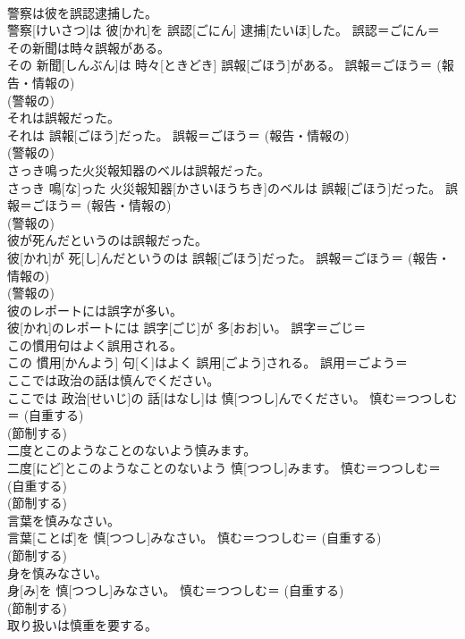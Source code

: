 \documentclass[8pt]{extreport}
\begin{document}
\begin{CJK}{UTF8}{min}
{\\	警察は彼を誤認逮捕した。	
\\	警察[けいさつ]は 彼[かれ]を 誤認[ごにん] 逮捕[たいほ]した。	誤認＝ごにん＝ 
\\	その新聞は時々誤報がある。	
\\	その 新聞[しんぶん]は 時々[ときどき] 誤報[ごほう]がある。	誤報＝ごほう＝ (報告・情報の) 
\\	(警報の) 
\\	それは誤報だった。	
\\	それは 誤報[ごほう]だった。	誤報＝ごほう＝ (報告・情報の) 
\\	(警報の) 
\\	さっき鳴った火災報知器のベルは誤報だった。	
\\	さっき 鳴[な]った 火災報知器[かさいほうちき]のベルは 誤報[ごほう]だった。	誤報＝ごほう＝ (報告・情報の) 
\\	(警報の) 
\\	彼が死んだというのは誤報だった。	
\\	彼[かれ]が 死[し]んだというのは 誤報[ごほう]だった。	誤報＝ごほう＝ (報告・情報の) 
\\	(警報の) 
\\	彼のレポートには誤字が多い。	
\\	彼[かれ]のレポートには 誤字[ごじ]が 多[おお]い。	誤字＝ごじ＝ 
\\	この慣用句はよく誤用される。	
\\	この 慣用[かんよう] 句[く]はよく 誤用[ごよう]される。	誤用＝ごよう＝ 
\\	ここでは政治の話は慎んでください。	
\\	ここでは 政治[せいじ]の 話[はなし]は 慎[つつし]んでください。	慎む＝つつしむ＝ (自重する) 
\\	(節制する) 
\\	二度とこのようなことのないよう慎みます。	
\\	二度[にど]とこのようなことのないよう 慎[つつし]みます。	慎む＝つつしむ＝ (自重する) 
\\	(節制する) 
\\	言葉を慎みなさい。	
\\	言葉[ことば]を 慎[つつし]みなさい。	慎む＝つつしむ＝ (自重する) 
\\	(節制する) 
\\	身を慎みなさい。	
\\	身[み]を 慎[つつし]みなさい。	慎む＝つつしむ＝ (自重する) 
\\	(節制する) 
\\	取り扱いは慎重を要する。	
}
\end{CJK}
\end{document}
